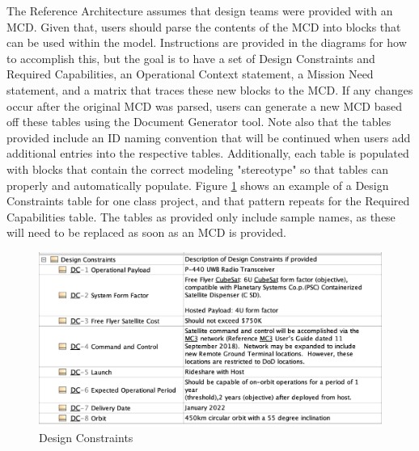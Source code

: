 The Reference Architecture assumes that design teams were provided with an MCD. Given that, users should parse the contents of the MCD into blocks that can be used within the model. Instructions are provided in the diagrams for how to accomplish this, but the goal is to have a set of Design Constraints and Required Capabilities, an Operational Context statement, a Mission Need statement, and a matrix that traces these new blocks to the MCD. If any changes occur after the original MCD was parsed, users can  generate a new MCD based off these tables using the Document Generator tool. Note also that the tables provided include an ID naming convention that will be continued when users add additional entries into the respective tables. Additionally, each table is populated with blocks that contain the correct modeling "stereotype" so that tables can properly and automatically populate. Figure \ref{fig:Design Constraints} shows an example of a Design Constraints table for one class project, and that pattern repeats for the Required Capabilities table. The tables as provided only include sample names, as these will need to be replaced as soon as an MCD is provided.

\begin{figure}[H]
    \centering
    \includegraphics[width=\textwidth]{Thesis/Analysis_and_Results/Analysis and Results Figures/Design Constraints.png}
    \caption{Design Constraints}
    \label{fig:Design Constraints}
\end{figure}

